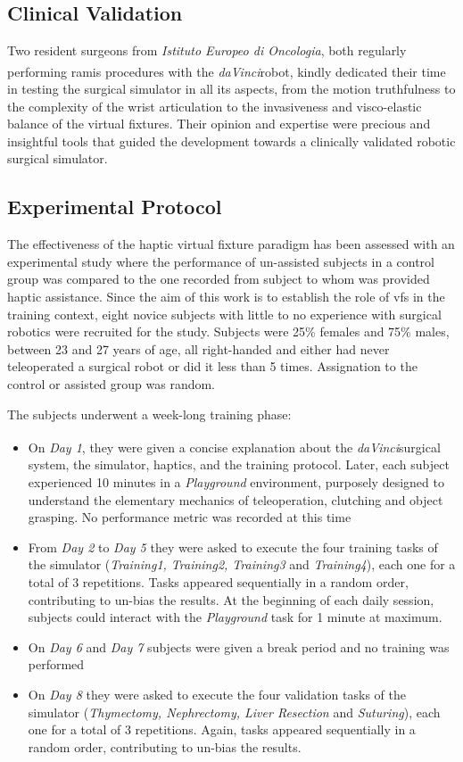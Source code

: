 \documentclass{article}
\newcommand{\cright}{\textsuperscript{\textregistered}\phantom{..}}
\begin{document}
\begin{multicols}{2}
\subsection{Clinical Validation}
Two resident surgeons from \textit{Istituto Europeo di Oncologia}, both regularly performing \ac{ramis} procedures with the \textit{daVinci}\cright robot, kindly dedicated their time in testing the surgical simulator in all its aspects, from the motion truthfulness to the complexity of the wrist articulation to the invasiveness and visco-elastic balance of the virtual fixtures. Their opinion and expertise were precious and insightful tools that guided the development towards a clinically validated robotic surgical simulator. 

\subsection{Experimental Protocol}
The effectiveness of the haptic virtual fixture paradigm has been assessed with an experimental study where the performance of un-assisted subjects in a control group was compared to the one recorded from subject to whom was provided haptic assistance. Since the aim of this work is to establish the role of \acp{vf} in the training context, eight novice subjects with little to no experience with surgical robotics were recruited for the study. Subjects were 25\% females and 75\% males, between 23 and 27 years of age, all right-handed and either had never teleoperated a surgical robot or did it less than 5 times. Assignation to the control or assisted group was random.

The subjects underwent a week-long training phase:
\begin{itemize}
  \item On \textit{Day 1}, they were given a concise explanation about the \textit{daVinci}\cright surgical system, the simulator, haptics, and the training protocol. Later, each subject experienced 10 minutes in a \textit{Playground} environment, purposely designed to understand the elementary mechanics of teleoperation, clutching and object grasping. No performance metric was recorded at this time
  \item From \textit{Day 2} to \textit{Day 5} they were asked to execute the four training tasks of the simulator (\textit{Training1, Training2, Training3} and \textit{Training4}), each one for a total of 3 repetitions. Tasks appeared sequentially in a random order, contributing to un-bias the results. At the beginning of each daily session, subjects could interact with the \textit{Playground} task for 1 minute at maximum.
  \item On \textit{Day 6} and \textit{Day 7} subjects were given a break period and no training was performed
  \item On \textit{Day 8} they were asked to execute the four validation tasks of the simulator (\textit{Thymectomy, Nephrectomy, Liver Resection} and \textit{Suturing}), each one for a total of 3 repetitions. Again, tasks appeared sequentially in a random order, contributing to un-bias the results.
\end{itemize}



\end{multicols}
\end{document}
